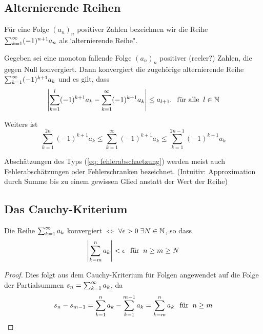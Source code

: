 \subsection{Alternierende Reihen}

Für eine Folge $(a_n)_n$ positiver Zahlen bezeichnen wir die Reihe $\sumkinfty (-1)^{n+1}a_n$ als `alternierende Reihe".

\begin{thm}
	Gegeben sei eine monoton fallende Folge $(a_n)_n$ positiver (reeler?) Zahlen, die gegen Null konvergiert. Dann konvergiert die zugehörige alternierende Reihe $\sumkinfty (-1)^{k+1} a_k$ und es gilt, dass
	\begin{equation}
		\label{eq: fehlerabschaetzung}
		\left | \sumkonetilll (-1)^{k+1} a_k - \sumkinfty (-1)^{k+1} a_k \right | \leq a_{l+1}. \fueralle l\in \nat
	\end{equation}
	
	Weiters ist
	\begin{equation}
		\sum_{k=1}^{2n} (-1)^{k+1} a_k \leq \sum_{k=1}^{\infty} (-1)^{k+1} a_k \leq \sum_{k=1}^{2n-1} (-1)^{k+1}a_k
	\end{equation}
	
	Abschätzungen des Typs (\autoref{eq: fehlerabschaetzung}) werden meist auch Fehlerabschätzungen oder Fehlerschranken bezeichnet. (Intuitiv: Approximation durch Summe bis zu einem gewissen Glied anstatt der Wert der Reihe)
\end{thm}


\subsection{Das Cauchy-Kriterium}

\begin{thm} Die Reihe $\sumkinfty a_k$ konvergiert $\iff$ $\forall \epsilon > 0 \; \exists N \in \nat$, so dass
	\begin{equation}
		\left | \sum_{k=m}^{n} a_k \right | < \epsilon \fuer n \geq m \geq N
	\end{equation}
\end{thm}
\begin{proof}
	Dies folgt aus dem Cauchy-Kriterium für Folgen angewendet auf die Folge der Partialsummen $s_n=\sumkinfty a_k$, da 
	\begin{equation}
				s_n - s_{m-1} = \sum_{k=1}^n a_k - \sum_{k=1}^{m-1} a_k = \sum_{k=m}^n a_k \fuer n \geq m
	\end{equation}
\end{proof}

